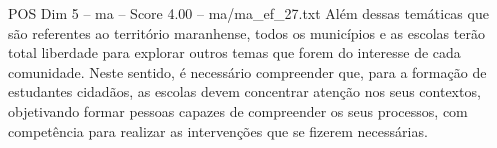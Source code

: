 \begin{textsample}{POS Dim 5 – ma – Score 4.00 – ma/ma\_ef\_27.txt}
Além dessas temáticas que são referentes ao território maranhense, todos os municípios e as escolas terão total liberdade para explorar outros temas que forem do interesse de cada comunidade.
Neste sentido, é necessário compreender que, para a formação de estudantes cidadãos, as escolas devem concentrar atenção nos seus contextos, objetivando formar pessoas capazes de compreender os seus processos, com competência para realizar as intervenções que se fizerem necessárias.

\end{textsample}
